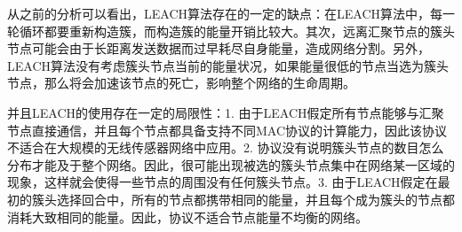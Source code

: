 \documentclass[UTF8]{article} %
\begin{document}
		从之前的分析可以看出，LEACH算法存在的一定的缺点：在LEACH算法中，每一轮循环都要重新构造簇，而构造簇的能量开销比较大。其次，远离汇聚节点的簇头节点可能会由于长距离发送数据而过早耗尽自身能量，造成网络分割。另外，LEACH算法没有考虑簇头节点当前的能量状况，如果能量很低的节点当选为簇头节点，那么将会加速该节点的死亡，影响整个网络的生命周期。
	
	并且LEACH的使用存在一定的局限性：1. 由于LEACH假定所有节点能够与汇聚节点直接通信，并且每个节点都具备支持不同MAC协议的计算能力，因此该协议不适合在大规模的无线传感器网络中应用。2. 协议没有说明簇头节点的数目怎么分布才能及于整个网络。因此，很可能出现被选的簇头节点集中在网络某一区域的现象，这样就会使得一些节点的周围没有任何簇头节点。3. 由于LEACH假定在最初的簇头选择回合中，所有的节点都携带相同的能量，并且每个成为簇头的节点都消耗大致相同的能量。因此，协议不适合节点能量不均衡的网络。
	
\end{document}
